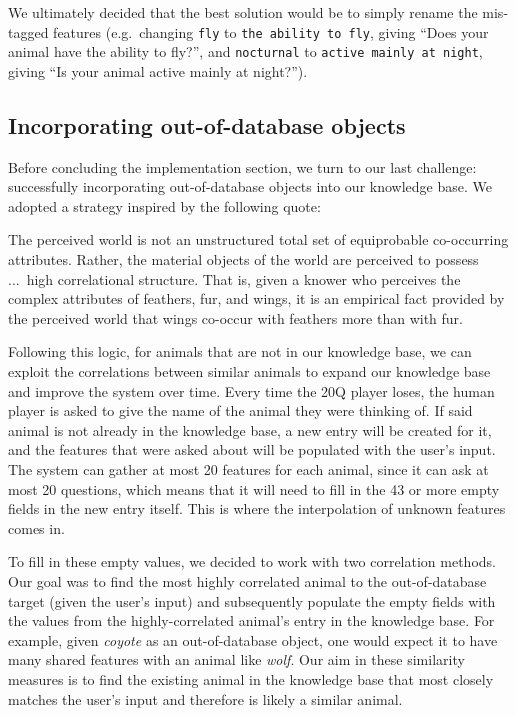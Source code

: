 \documentclass[11pt,a4paper]{article}
\begin{document}
We ultimately decided that the best solution would be to simply rename the mis-tagged features (e.g.\ changing \texttt{fly} to \texttt{the ability to fly}, giving ``Does your animal have the ability to fly?'', and \texttt{nocturnal} to \texttt{active mainly at night}, giving ``Is your animal active mainly at night?'').

\subsection{Incorporating out-of-database objects}
\label{subsec:out-of-db}

Before concluding the implementation section, we turn to our last challenge: successfully incorporating out-of-database objects into our knowledge base. 
We adopted a strategy inspired by the following quote:

\begin{displayquote}
The perceived world is not an unstructured total set of equiprobable co-occurring attributes. 
Rather, the material objects of the world are perceived to possess ...\ high correlational structure.
That is, given a knower who perceives the complex attributes of feathers, fur, and wings, it is an empirical fact provided by the perceived world that wings co-occur with feathers more than with fur. \citep[29]{Rosch1978}
\end{displayquote}

Following this logic, for animals that are not in our knowledge base, we can exploit the correlations between similar animals to expand our knowledge base and improve the system over time.
Every time the 20Q player loses, the human player is asked to give the name of the animal they were thinking of. 
If said animal is not already in the knowledge base, a new entry will be created for it, and the features that were asked about will be populated with the user's input. 
The system can gather at most 20 features for each animal, since it can ask at most 20 questions, which means that it will need to fill in the 43 or more empty fields in the new entry itself.
This is where the interpolation of unknown features comes in.

To fill in these empty values, we decided to work with two correlation methods. 
Our goal was to find the most highly correlated animal to the out-of-database target (given the user's input) and subsequently populate the empty fields with the values from the highly-correlated animal's entry in the knowledge base. 
For example, given \textit{coyote} as an out-of-database object, one would expect it to have many shared features with an animal like \textit{wolf}. 
Our aim in these similarity measures is to find the existing animal in the knowledge base that most closely matches the user's input and therefore is likely a similar animal.
\end{document}
